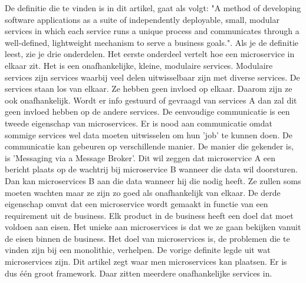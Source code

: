 De definitie die te vinden is in dit artikel, gaat als volgt: "A method of developing software applications as a suite of independently deployable, small, modular services in which each service runs a unique process and communicates through a well-defined, lightweight mechanism to serve a business goals.". Als je de definitie leest, zie je drie onderdelen. Het eerste onderdeel vertelt hoe een microservice in elkaar zit. Het is een onafhankelijke, kleine, modulaire services. Modulaire services zijn services waarbij veel delen uitwisselbaar zijn met diverse services. De services staan los van elkaar. Ze hebben geen invloed op elkaar. Daarom zijn ze ook onafhankelijk. Wordt er info gestuurd of gevraagd van services A dan zal dit geen invloed hebben op de andere services. De eenvoudige communicatie is een tweede eigenschap van microservices. Er is nood aan communicatie omdat sommige services wel data moeten uitwisselen om hun 'job' te kunnen doen. De communicatie kan gebeuren op verschillende manier. De manier die gekender is, is 'Messaging via a Message Broker'. Dit wil zeggen dat microservice A een bericht plaats op de wachtrij bij microservice B wanneer die data wil doorsturen. Dan kan microservices B aan die data wanneer hij die nodig heeft. Ze zullen soms moeten wachten maar ze zijn zo goed als onafhankelijk van elkaar. De derde eigenschap omvat dat een microservice wordt gemaakt in functie van een requirement uit de business. Elk product in de business heeft een doel dat moet voldoen aan eisen. Het unieke aan microservices is dat we ze gaan bekijken vanuit de eisen binnen de business. Het doel van microservices is, de problemen die te vinden zijn bij een monolithic, verhelpen. De vorige definite legde uit wat microservices zijn. Dit artikel zegt waar men microservices kan plaatsen. Er is dus één groot framework. Daar zitten meerdere onafhankelijke services in.

